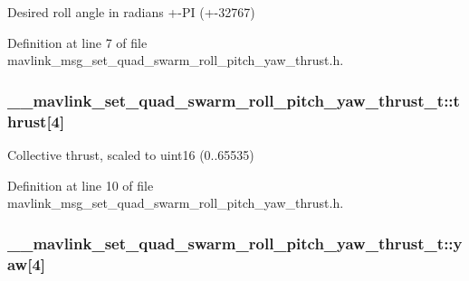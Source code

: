 Desired roll angle in radians +-\/\-P\-I (+-\/32767) 



Definition at line 7 of file mavlink\-\_\-msg\-\_\-set\-\_\-quad\-\_\-swarm\-\_\-roll\-\_\-pitch\-\_\-yaw\-\_\-thrust.\-h.

\hypertarget{struct____mavlink__set__quad__swarm__roll__pitch__yaw__thrust__t_a66b74437a0604241f05a4939a400b53a}{
\subsubsection[{thrust}]{ \-\_\-\-\_\-mavlink\-\_\-set\-\_\-quad\-\_\-swarm\-\_\-roll\-\_\-pitch\-\_\-yaw\-\_\-thrust\-\_\-t\-::thrust\mbox{[}4\mbox{]}}}\label{struct____mavlink__set__quad__swarm__roll__pitch__yaw__thrust__t_a66b74437a0604241f05a4939a400b53a}


Collective thrust, scaled to uint16 (0..65535) 



Definition at line 10 of file mavlink\-\_\-msg\-\_\-set\-\_\-quad\-\_\-swarm\-\_\-roll\-\_\-pitch\-\_\-yaw\-\_\-thrust.\-h.

\hypertarget{struct____mavlink__set__quad__swarm__roll__pitch__yaw__thrust__t_a23901a88a5b06f83d2854b47a15cc1fa}{
\subsubsection[{yaw}]{ \-\_\-\-\_\-mavlink\-\_\-set\-\_\-quad\-\_\-swarm\-\_\-roll\-\_\-pitch\-\_\-yaw\-\_\-thrust\-\_\-t\-::yaw\mbox{[}4\mbox{]}}}\label{struct____mavlink__set__quad__swarm__roll__pitch__yaw__thrust__t_a23901a88a5b06f83d2854b47a15cc1fa}


